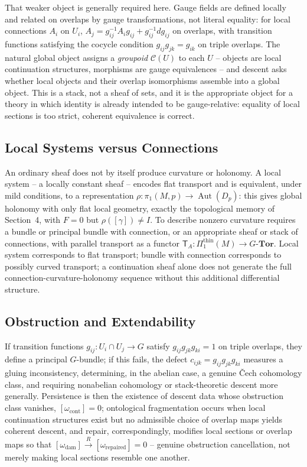 \documentclass[11pt]{article}
\begin{document}
That weaker object is generally required here. Gauge fields are defined locally and related on overlaps by gauge transformations, not literal equality: for local connections $A_i$ on $U_i$, $A_j = g_{ij}^{-1} A_i g_{ij} + g_{ij}^{-1} dg_{ij}$ on overlaps, with transition functions satisfying the cocycle condition $g_{ij} g_{jk} = g_{ik}$ on triple overlaps. The natural global object assigns a \emph{groupoid} $\mathscr{C}(U)$ to each $U$ -- objects are local continuation structures, morphisms are gauge equivalences -- and descent asks whether local objects and their overlap isomorphisms assemble into a global object. This is a stack, not a sheaf of sets, and it is the appropriate object for a theory in which identity is already intended to be gauge-relative: equality of local sections is too strict, coherent equivalence is correct.

\subsection{Local Systems versus Connections}

An ordinary sheaf does not by itself produce curvature or holonomy. A local system -- a locally constant sheaf -- encodes flat transport and is equivalent, under mild conditions, to a representation $\rho : \pi_1(M,p) \to \operatorname{Aut}(D_p)$: this gives global holonomy with only flat local geometry, exactly the topological memory of Section~4, with $F=0$ but $\rho([\gamma]) \neq I$. To describe nonzero curvature requires a bundle or principal bundle with connection, or an appropriate sheaf or stack of connections, with parallel transport as a functor $\mathsf{T}_A : \Pi_1^{\mathrm{thin}}(M) \to G\text{-}\mathbf{Tor}$. Local system corresponds to flat transport; bundle with connection corresponds to possibly curved transport; a continuation sheaf alone does not generate the full connection-curvature-holonomy sequence without this additional differential structure.

\subsection{Obstruction and Extendability}

If transition functions $g_{ij} : U_i \cap U_j \to G$ satisfy $g_{ij} g_{jk} g_{ki} = 1$ on triple overlaps, they define a principal $G$-bundle; if this fails, the defect $c_{ijk} = g_{ij} g_{jk} g_{ki}$ measures a gluing inconsistency, determining, in the abelian case, a genuine \v{C}ech cohomology class, and requiring nonabelian cohomology or stack-theoretic descent more generally. Persistence is then the existence of descent data whose obstruction class vanishes, $[\omega_{\mathrm{cont}}] = 0$; ontological fragmentation occurs when local continuation structures exist but no admissible choice of overlap maps yields coherent descent, and repair, correspondingly, modifies local sections or overlap maps so that $[\omega_{\mathrm{dam}}] \xrightarrow{R} [\omega_{\mathrm{repaired}}] = 0$ -- genuine obstruction cancellation, not merely making local sections resemble one another.
\end{document}
